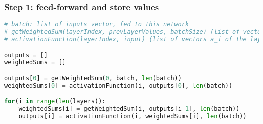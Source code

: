 \documentclass[11pt,a4paper]{report}
\begin{document}
\subsubsection{Step 1: feed-forward and store values}

\begin{lstlisting}[language=Python]
# batch: list of inputs vector, fed to this network
# getWeightedSum(layerIndex, prevLayerValues, batchSize) (list of vectors z_i of the layer layerIndex of all items in the batch: it's a matrix)
# activationFunction(layerIndex, input) (list of vectors a_i of the layer layerIndex of all items in the batch: it's a matrix)

outputs = []
weightedSums = []

outputs[0] = getWeightedSum(0, batch, len(batch))
weightedSums[0] = activationFunction(i, outputs[0], len(batch))

for(i in range(len(layers)):
    weightedSums[i] = getWeightedSum(i, outputs[i-1], len(batch))
    outputs[i] = activationFunction(i, weightedSums[i], len(batch))
\end{lstlisting}

\newpage
\end{document}
